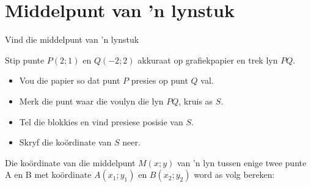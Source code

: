 \section{Middelpunt van ’n lynstuk}
\begin{Investigation}{Vind die middelpunt van 'n lynstuk}
\item Stip punte $P(2;1)$ en $Q(-2;2)$ akkuraat op grafiekpapier en trek lyn $PQ$.
\begin{itemize}
 \item Vou die papier so dat punt $P$ presies op punt $Q$ val.
\item Merk die punt waar die voulyn die lyn $PQ$, kruis as $S$.
\item Tel die blokkies en vind presiese posisie van $S$.
\item Skryf die ko\"ordinate van $S$ neer.
\end{itemize}

\end{Investigation}
Die koördinate van die middelpunt $M(x;y)$ van ’n lyn tussen enige twee punte A en B met koördinate $A(x_1;y_1)$ en $B(x_2;y_2)$ word as volg bereken:

\setcounter{subfigure}{0}
\begin{figure}[H] %
\begin{center}
\end{center}
\end{figure}      

